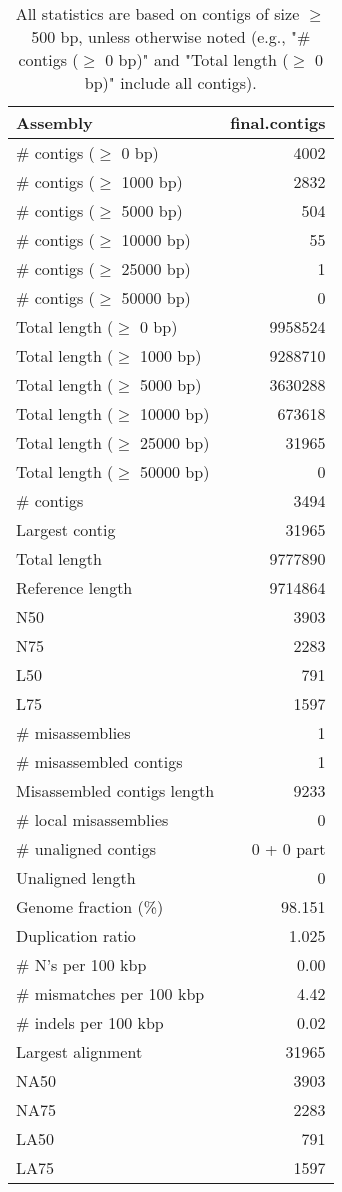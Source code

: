 \documentclass[12pt,a4paper]{article}
\begin{document}
\begin{table}[ht]
\begin{center}
\caption{All statistics are based on contigs of size $\geq$ 500 bp, unless otherwise noted (e.g., "\# contigs ($\geq$ 0 bp)" and "Total length ($\geq$ 0 bp)" include all contigs).}
\begin{tabular}{|l*{1}{|r}|}
\hline
Assembly & final.contigs \\ \hline
\# contigs ($\geq$ 0 bp) & 4002 \\ \hline
\# contigs ($\geq$ 1000 bp) & 2832 \\ \hline
\# contigs ($\geq$ 5000 bp) & 504 \\ \hline
\# contigs ($\geq$ 10000 bp) & 55 \\ \hline
\# contigs ($\geq$ 25000 bp) & 1 \\ \hline
\# contigs ($\geq$ 50000 bp) & 0 \\ \hline
Total length ($\geq$ 0 bp) & 9958524 \\ \hline
Total length ($\geq$ 1000 bp) & 9288710 \\ \hline
Total length ($\geq$ 5000 bp) & 3630288 \\ \hline
Total length ($\geq$ 10000 bp) & 673618 \\ \hline
Total length ($\geq$ 25000 bp) & 31965 \\ \hline
Total length ($\geq$ 50000 bp) & 0 \\ \hline
\# contigs & 3494 \\ \hline
Largest contig & 31965 \\ \hline
Total length & 9777890 \\ \hline
Reference length & 9714864 \\ \hline
N50 & 3903 \\ \hline
N75 & 2283 \\ \hline
L50 & 791 \\ \hline
L75 & 1597 \\ \hline
\# misassemblies & 1 \\ \hline
\# misassembled contigs & 1 \\ \hline
Misassembled contigs length & 9233 \\ \hline
\# local misassemblies & 0 \\ \hline
\# unaligned contigs & 0 + 0 part \\ \hline
Unaligned length & 0 \\ \hline
Genome fraction (\%) & 98.151 \\ \hline
Duplication ratio & 1.025 \\ \hline
\# N's per 100 kbp & 0.00 \\ \hline
\# mismatches per 100 kbp & 4.42 \\ \hline
\# indels per 100 kbp & 0.02 \\ \hline
Largest alignment & 31965 \\ \hline
NA50 & 3903 \\ \hline
NA75 & 2283 \\ \hline
LA50 & 791 \\ \hline
LA75 & 1597 \\ \hline
\end{tabular}
\end{center}
\end{table}
\end{document}
